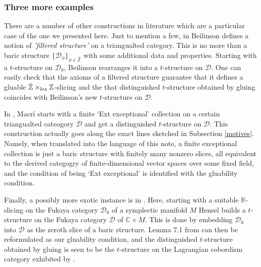 \documentclass{article}
\newcommand\blankpage{
    \null
    \thispagestyle{empty}
    \addtocounter{page}{-1}
    \newpage}
\theoremstyle{definition}
\newcommand{\Z}{\mathbb{Z}}
\newcommand{\lex}{\times_{\textnormal{lex}}}
\begin{document}
\subsubsection{Three more examples}

There are a number of other constructions in literature which are a particular case of the one we presented here. Just to mention a few, in \cite{beil} Beilinson defines a notion of \textit{'filtered structure'} on a triangualted category. This is no more than a baric structure $\{ \mathscr{D}_{\phi} \}_{\phi \in \hat{\Z}}$ with some additional data and properties. Starting with a $t$-structure on $\mathscr{D}_0$, Beilinson rearranges it into a $t$-structure on $\mathscr{D}$. One can easily check that the axioms of a filtered structure guarantee that it defines a gluable $\hat{\Z} \lex \Z$-slicing and the that distinguished $t$-structure obtained by gluing coincides with Beilinson's new $t$-structure on $\mathscr{D}$. \\ 
\par

In \cite{macri}, Macr\'i starts with a finite `Ext exceptional' collection on a certain triangualted cateogory $\mathscr{D}$ and get a distinguished $t$-structure on $\mathscr{D}$. This construction actually goes along the exact lines sketched in Subsection \ref{motives}. Namely, when translated into the language of this note, a finite exceptional collection is just a baric structure with finitely many nonzero slices, all equivalent to the derived categogry of finite-dimensional vector spaces over some fixed field, and the condition of being `Ext exceptional' is identified with the gluability condition. \\
\par
Finally, a possibly more exotic instance is in \cite{lagra}. Here, starting with a suitable $\mathbb{R}$-slicing on the Fukaya category $\mathscr{D}_0$ of a symplectic manifold $M$ Hensel builds a $t$-structure on the Fukaya category $\mathscr{D}$ of $\mathbb{C} \times M$. This is done by embedding $\mathscr{D}_0$ into $\mathscr{D}$ as the zeroth slice of a baric structure. Lemma 7.1 from \cite{lagra} can then be reformulated as our gluability condition, and the distinguished $t$-structure obtained by gluing is seen to be the $t$-structure on the Lagrangian cobordism category exhibited by \cite{lagra}. \\



\newpage

\afterpage{\blankpage}
\clearpage 


\end{document}
